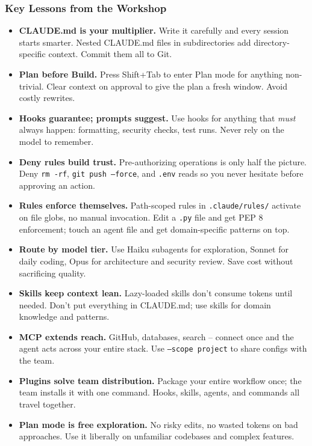 \begin{frame}[fragile]\frametitle{Key Lessons from the Workshop}
  \begin{itemize}
    \item \textbf{CLAUDE.md is your multiplier.} Write it carefully and every session starts smarter. Nested CLAUDE.md files in subdirectories add directory-specific context. Commit them all to Git.
    \item \textbf{Plan before Build.} Press Shift+Tab to enter Plan mode for anything non-trivial. Clear context on approval to give the plan a fresh window. Avoid costly rewrites.
    \item \textbf{Hooks guarantee; prompts suggest.} Use hooks for anything that \textit{must} always happen: formatting, security checks, test runs. Never rely on the model to remember.
    \item \textbf{Deny rules build trust.} Pre-authorizing operations is only half the picture. Deny \texttt{rm -rf}, \texttt{git push --force}, and \texttt{.env} reads so you never hesitate before approving an action.
    \item \textbf{Rules enforce themselves.} Path-scoped rules in \texttt{.claude/rules/} activate on file globs, no manual invocation. Edit a \texttt{.py} file and get PEP 8 enforcement; touch an agent file and get domain-specific patterns on top.
    \item \textbf{Route by model tier.} Use Haiku subagents for exploration, Sonnet for daily coding, Opus for architecture and security review. Save cost without sacrificing quality.
    \item \textbf{Skills keep context lean.} Lazy-loaded skills don't consume tokens until needed. Don't put everything in CLAUDE.md; use skills for domain knowledge and patterns.
    \item \textbf{MCP extends reach.} GitHub, databases, search -- connect once and the agent acts across your entire stack. Use \texttt{--scope project} to share configs with the team.
    \item \textbf{Plugins solve team distribution.} Package your entire workflow once; the team installs it with one command. Hooks, skills, agents, and commands all travel together.
    \item \textbf{Plan mode is free exploration.} No risky edits, no wasted tokens on bad approaches. Use it liberally on unfamiliar codebases and complex features.
  \end{itemize}
\end{frame}


